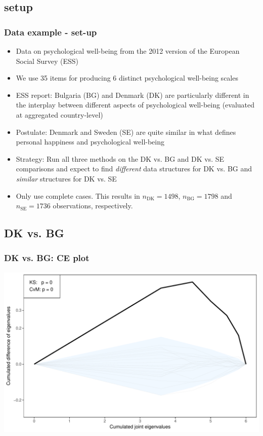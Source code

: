 \documentclass[a4]{beamer}
\begin{document}
\subsection{setup}
\begin{frame}
\frametitle{Data example - set-up}
\begin{itemize}
\item Data on psychological well-being from the 2012 version of the European Social Survey (ESS)
\item We use 35 items for producing 6 distinct psychological well-being scales
\item ESS report: Bulgaria (BG) and Denmark (DK) are particularly different in the interplay between different aspects of psychological well-being (evaluated at aggregated country-level)
\item Postulate: Denmark and Sweden (SE) are quite similar in what defines personal happiness and psychological well-being
\item Strategy: Run all three methods on the DK vs. BG and DK vs. SE comparisons and expect to find \textit{different} data structures for DK vs. BG and \textit{similar} structures for DK vs. SE
\item Only use complete cases. This results in $n_\text{DK} = 1498$, $n_\text{BG} = 1798$ and $n_\text{SE} = 1736$ observations, respectively. 
\end{itemize}
\end{frame}

\subsection{DK vs. BG}
\begin{frame}
\frametitle{DK vs. BG: CE plot}
\includegraphics[scale = 0.5]{essDKBGce.pdf}
\end{frame}
\end{document}
